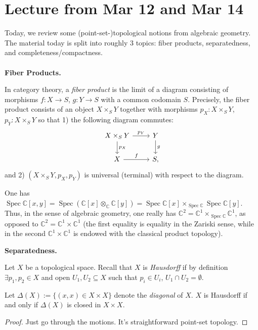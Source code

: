 \documentclass[a4paper,12pt]{amsart}
\newcommand{\C}{\ensuremath{\mathbb{C}}}
\DeclareMathOperator{\Spec}{Spec}
\begin{document}
\section{Lecture from Mar 12 and Mar 14}
\noindent Today, we review some (point-set-)topological notions from algebraic geometry. The material today is split into roughly 3 topics: fiber products, separatedness, and completeness/compactness. 
\\\\
\textbf{Fiber Products.} 
\begin{definition}
In category theory, a \emph{fiber product} is the limit of a diagram consisting of morphisms $f: X \to S$, $g : Y \to S$ with a common codomain $S$. Precisely, the fiber product consists of an object $X \times_S Y$ together with morphisms $p_X: X \times_S Y$, $p_Y : X \times_S Y$ so that 
1) the following diagram commutes:
\[\begin{tikzcd}
X \times_S Y \arrow[d, "p_X"] \arrow[r, "p_Y"] & Y \arrow[d, "g"] \\
X \arrow[r, "f"]                               & S,             
\end{tikzcd}\]
and 2) $(X \times_S Y, p_X, p_Y)$ is universal (terminal) with respect to the diagram.
\end{definition}
\begin{example}
One has $\Spec \C[x,y] = \Spec (\C[x] \otimes_\C \C[y]) = \Spec \C[x] \times_{\Spec \C} \Spec \C[y]$. Thus, in the sense of algebraic geometry, one really has $\C^2 = \C^1 \times_{\Spec \C} \C^1$, as opposed to $\C^2 = \C^1 \times \C^1$ (the first equality is equality in the Zariski sense, while in the second $\C^1 \times \C^1$ is endowed with the classical product topology).
\end{example}
\noindent \textbf{Separatedness.} 
\begin{definition}
Let $X$ be a topological space. Recall that $X$ is \emph{Hausdorff} if by definition $\exists p_1,p_2 \in X$ and open $U_1,U_2 \subseteq X$ such that $p_i \in U_i$, $U_1 \cap U_2 = \emptyset$.
\end{definition}
\begin{proposition}
    Let $\Delta(X) := \{ (x,x) \in X \times X\}$ denote the \emph{diagonal} of $X$. $X$ is Hausdorff if and only if $\Delta(X)$ is closed in $X \times X$.
\end{proposition}
\begin{proof}
Just go through the motions. It's straightforward point-set topology.
\end{proof}
\end{document}
